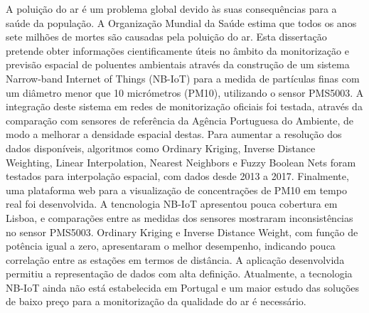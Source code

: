 \noindent A poluição do ar é um problema global devido às suas consequências para a saúde da população. A Organização Mundial da Saúde estima que todos os anos sete milhões de mortes são causadas pela poluição do ar. Esta dissertação pretende obter informações cientificamente úteis no âmbito da monitorização e previsão espacial de poluentes ambientais através da construção de um sistema Narrow-band Internet of Things (NB-IoT) para a medida de partículas finas com um diâmetro menor que 10 micrómetros (PM10), utilizando o sensor PMS5003. A integração deste sistema em redes de monitorização oficiais foi testada, através da comparação com sensores de referência da Agência Portuguesa do Ambiente, de modo a melhorar a densidade espacial destas.
Para aumentar a resolução dos dados disponíveis, algoritmos como Ordinary Kriging, Inverse Distance Weighting, Linear Interpolation, Nearest Neighbors e Fuzzy Boolean Nets foram testados para interpolação espacial, com dados desde 2013 a 2017. Finalmente, uma plataforma web para a visualização de concentrações de PM10 em tempo real foi desenvolvida.
A tencnologia NB-IoT apresentou pouca cobertura em Lisboa, e comparações entre as medidas dos sensores mostraram inconsistências no sensor PMS5003. Ordinary Kriging e Inverse Distance Weight, com função de potência igual a zero, apresentaram o melhor desempenho, indicando pouca correlação entre as estações em termos de distância. A aplicação desenvolvida permitiu a representação de dados com alta definição. Atualmente, a tecnologia NB-IoT ainda não está estabelecida em Portugal e um maior estudo das soluções de baixo preço para a monitorização da qualidade do ar é necessário.
